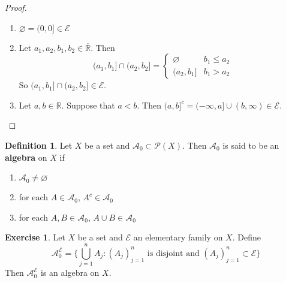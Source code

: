 \documentclass[12pt]{amsart}
\theoremstyle{definition}
\newtheorem{defn}[definition]{Definition}
\newtheorem{ex}[definition]{Exercise}
\newcommand{\R}{\mathbb{R}}
\newcommand{\MA}{\mathcal{A}}
\newcommand{\MP}{\mathcal{P}}
\newcommand{\ME}{\mathcal{E}}
\newcommand{\lex}[1]{\label{ex:#1}}
\newcommand{\ld}[1]{\label{defn:#1}}
\begin{document}
	\begin{proof}\
		\begin{enumerate}
			\item $\varnothing = (0,0] \in \ME$
			\item Let $a_1, a_2, b_1, b_2 \in \overline{\R}$. Then 
			\[
			(a_1, b_1] \cap  (a_2, b_2] =
			\begin{cases}
				\varnothing  & b_1 \leq a_2 \\
				(a_2, b_1] & b_1 > a_2 
			\end{cases} 
			\]
			So $(a_1, b_1] \cap  (a_2, b_2] \in \ME$.
			\item Let $a, b \in \R$. Suppose that $a < b$. Then $(a,b]^c = (-\infty, a] \cup (b, \infty) \in \ME$. 
		\end{enumerate}
	\end{proof}
	
	\begin{defn} \ld{00000} 
		Let $X$ be a set and $\MA_0 \subset \MP(X)$. Then $\MA_0$ is said to be an \textbf{algebra} on $X$ if 
		\begin{enumerate}
			\item $\MA_0 \neq \varnothing$
			\item for each $A \in \MA_0$, $A^c \in \MA_0$
			\item for each $A,B \in \MA_0$, $A \cup B \in \MA_0$
		\end{enumerate}
	\end{defn}
	
	\begin{ex} \lex{00000} 
		Let $X$ be a set and $\ME$ an elementary family on $X$. Define $$\MA^{\ME}_0 = \bigg \{ \bigcup_{j=1}^n A_j: (A_j)_{j=1}^n \text{ is disjoint and } (A_j)_{j=1}^n \subset \ME \bigg \}$$ Then $\MA^{\ME}_0$ is an algebra on $X$.
	\end{ex}	
	
\end{document}

